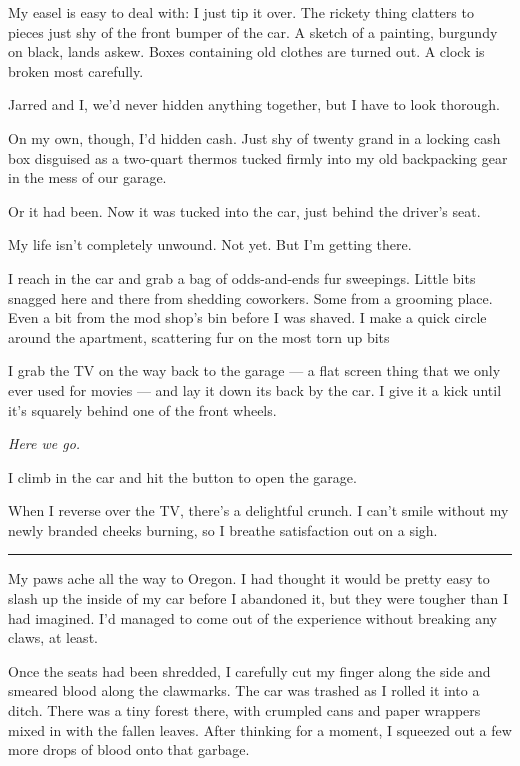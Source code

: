 My easel is easy to deal with: I just tip it over. The rickety thing clatters to pieces just shy of the front bumper of the car. A sketch of a painting, burgundy on black, lands askew. Boxes containing old clothes are turned out. A clock is broken most carefully.

Jarred and I, we'd never hidden anything together, but I have to look thorough.

On my own, though, I'd hidden cash. Just shy of twenty grand in a locking cash box disguised as a two-quart thermos tucked firmly into my old backpacking gear in the mess of our garage.

Or it had been. Now it was tucked into the car, just behind the driver's seat.

My life isn't completely unwound. Not yet. But I'm getting there.

I reach in the car and grab a bag of odds-and-ends fur sweepings. Little bits snagged here and there from shedding coworkers. Some from a grooming place. Even a bit from the mod shop's bin before I was shaved. I make a quick circle around the apartment, scattering fur on the most torn up bits

I grab the TV on the way back to the garage --- a flat screen thing that we only ever used for movies --- and lay it down its back by the car. I give it a kick until it's squarely behind one of the front wheels.

\emph{Here we go.}

I climb in the car and hit the button to open the garage.

When I reverse over the TV, there's a delightful crunch. I can't smile without my newly branded cheeks burning, so I breathe satisfaction out on a sigh.

\begin{center}\rule{0.5\linewidth}{\linethickness}\end{center}

My paws ache all the way to Oregon. I had thought it would be pretty easy to slash up the inside of my car before I abandoned it, but they were tougher than I had imagined. I'd managed to come out of the experience without breaking any claws, at least.

Once the seats had been shredded, I carefully cut my finger along the side and smeared blood along the clawmarks. The car was trashed as I rolled it into a ditch. There was a tiny forest there, with crumpled cans and paper wrappers mixed in with the fallen leaves. After thinking for a moment, I squeezed out a few more drops of blood onto that garbage.

